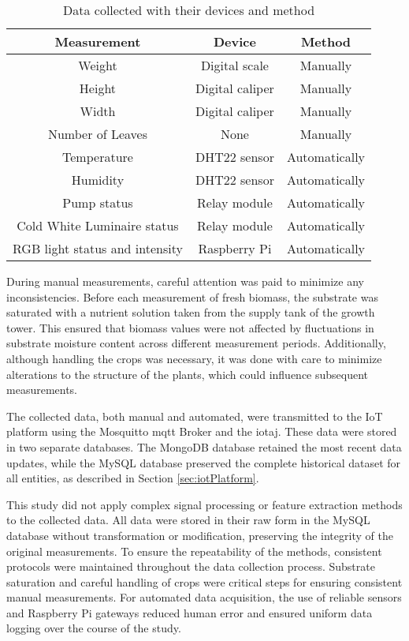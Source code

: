 \documentclass[preprint, review, 12pt]{elsarticle}
\begin{document}
\begin{table}
    \centering
    \begin{tabular}{c|c|c}
    \hline
        \textbf{Measurement} & \textbf{Device} & \textbf{Method}  \\
        \hline
         Weight & Digital scale & Manually  \\
         Height & Digital caliper & Manually   \\
         Width & Digital caliper & Manually  \\
         Number of Leaves & None & Manually   \\
         Temperature & DHT22 sensor & Automatically  \\
         Humidity & DHT22 sensor & Automatically  \\
         Pump status & Relay module & Automatically \\
         Cold White Luminaire status & Relay module & Automatically  \\
         RGB light status and intensity & Raspberry Pi & Automatically  \\
         \hline
    \end{tabular}
    \caption{Data collected with their devices and method}
    \label{tab:data_collection}
\end{table}

During manual measurements, careful attention was paid to minimize any inconsistencies. Before each measurement of fresh biomass, the substrate was saturated with a nutrient solution taken from the supply tank of the growth tower. This ensured that biomass values were not affected by fluctuations in substrate moisture content across different measurement periods. Additionally, although handling the crops was necessary, it was done with care to minimize alterations to the structure of the plants, which could influence subsequent measurements.

The collected data, both manual and automated, were transmitted to the IoT platform using the Mosquitto \gls{mqtt} Broker and the \gls{iotaj}. These data were stored in two separate databases. The MongoDB database retained the most recent data updates, while the MySQL database preserved the complete historical dataset for all entities, as described in Section \ref{sec:iotPlatform}.

This study did not apply complex signal processing or feature extraction methods to the collected data. All data were stored in their raw form in the MySQL database without transformation or modification, preserving the integrity of the original measurements. To ensure the repeatability of the methods, consistent protocols were maintained throughout the data collection process. Substrate saturation and careful handling of crops were critical steps for ensuring consistent manual measurements. For automated data acquisition, the use of reliable sensors and Raspberry Pi gateways reduced human error and ensured uniform data logging over the course of the study.
\end{document}
